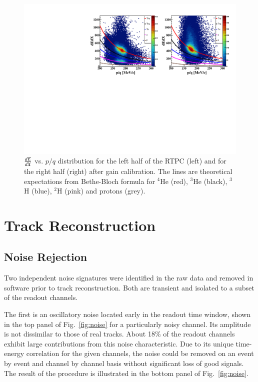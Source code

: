 \documentclass[preprint,5p]{elsarticle}
\begin{document}
\begin{figure}[tb]
\centering
\includegraphics[scale=0.73]{fig_2017/f_dedx_p_exp_2nd.pdf}
\caption{$\small{\frac{dE}{dX}}$ vs. $p/q$ distribution for the left half of 
   the RTPC (left) and for the right half (right) after gain calibration.  
   The lines are theoretical expectations from Bethe-Bloch formula for $^4$He 
   (red), $^3$He (black), $^3$H (blue), $^2$H (pink) and protons (grey).}
\label{fig:dedx_p_exp_2nd}
\end{figure}

\section{Track Reconstruction}
\label{sec_tracking}

\subsection{Noise Rejection}
Two independent noise signatures were identified in the raw data and removed 
in software prior to track reconstruction. Both are transient and isolated to 
a subset of the readout channels. 

The first is an oscillatory noise located early in the readout time window, 
shown in the top panel of Fig.~\ref{fig:noise} for a particularly noisy 
channel. Its amplitude is not dissimilar to those of real tracks. About 
18\% of the readout channels exhibit large contributions from this noise 
characteristic. Due to its unique time-energy correlation for the given 
channels, the noise could be removed on an event by event and channel by 
channel basis without significant loss of good signals. The result of the
procedure is illustrated in the bottom panel of Fig.~\ref{fig:noise}.
\end{document}
